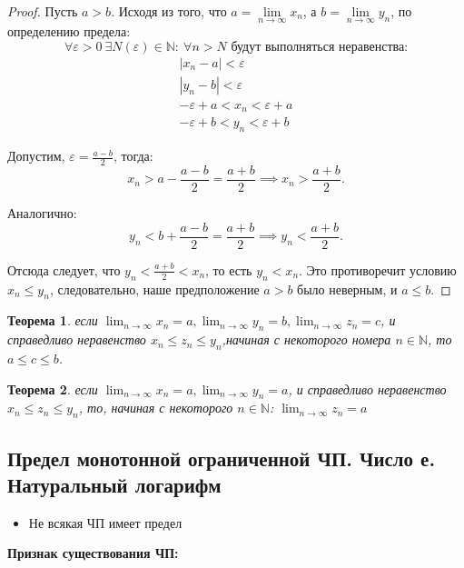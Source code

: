 \documentclass[12pt, a4paper]{article}
\newtheorem{theorem}{Теорема}[subsection]
\theoremstyle{remark}
\newcommand{\N}{\mathbb{N}}
\begin{document}
	\begin{proof}
		Пусть \(a > b\). Исходя из того, что \(a = \lim\limits_{n \to \infty} x_n\), а \(b = \lim\limits_{n \to \infty} y_n\), по определению предела:
		\[
		\forall \varepsilon > 0 \ \exists N(\varepsilon) \in \mathbb{N}: \ \forall n > N \text{ будут выполняться неравенства:}
		\]
		\begin{gather*}
			|x_n - a| < \varepsilon \\
			|y_n - b| < \varepsilon \\
			-\varepsilon + a < x_n < \varepsilon + a \\
			-\varepsilon + b < y_n < \varepsilon + b
		\end{gather*}
		
		Допустим, \(\varepsilon = \frac{a-b}{2}\), тогда:
		\[
		x_n > a - \frac{a - b}{2} = \frac{a + b}{2} \implies x_n > \frac{a + b}{2}.
		\]
		
		Аналогично:
		\[
		y_n < b + \frac{a - b}{2} = \frac{a + b}{2} \implies y_n < \frac{a + b}{2}.
		\]
		
		Отсюда следует, что \(y_n < \frac{a + b}{2} < x_n\), то есть \(y_n < x_n\). Это противоречит условию \(x_n \leq y_n\), следовательно, наше предположение \(a > b\) было неверным, и \(a \leq b\).
	\end{proof}
	
	\begin{theorem}
		если $\lim_{n \to \infty} x_n = a, \lim_{n \to \infty} y_n = b, \lim_{n \to \infty} z_n = c$, и справедливо неравенство $x_n \leq z_n \leq y_n$,начиная с некоторого номера $n \in \N$, то $a \leq c \leq b$.
	\end{theorem}
	
	\begin{theorem}
		если $\lim_{n \to \infty} x_n = a, \lim_{n \to \infty} y_n = a$, и справедливо неравенство $x_n \leq z_n \leq y_n$, то, начиная с некоторого $n \in \N$: $\lim_{n \to \infty} z_n = a$
	\end{theorem}
	
	\newpage
	\subsection{Предел монотонной ограниченной ЧП. Число е. Натуральный логарифм}
	
	\begin{itemize}
		\item Не всякая ЧП имеет предел
	\end{itemize}
	
	\begin{center}
		\textbf{Признак существования ЧП:}
	\end{center}
	
\end{document}
